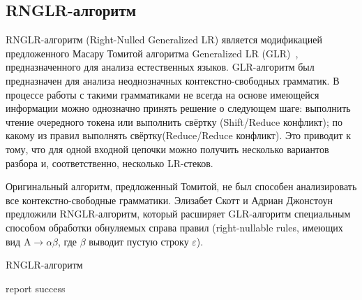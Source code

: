 \subsection{RNGLR-алгоритм}
RNGLR-алгоритм (Right-Nulled Generalized LR) является модификацией предложенного Масару Томитой алгоритма Generalized LR (GLR)~\cite{Tomita}, предназначенного для анализа естественных языков. 
GLR-алгоритм был предназначен для анализа неоднозначных контекстно-свободных грамматик. В процессе работы с такими грамматиками не всегда на основе имеющейся информации можно однозначно принять решение 
о следующем шаге: выполнить чтение очередного токена или выполнить свёртку (Shift/Reduce конфликт); по какому из правил выполнять свёртку(Reduce/Reduce конфликт). Это приводит к тому, что для одной 
входной цепочки можно получить несколько вариантов разбора и, соответственно, несколько LR-стеков.  

Оригинальный алгоритм, предложенный Томитой, не был способен анализировать все контекстно-свободные грамматики. 
Элизабет Скотт и Адриан Джонстоун предложили RNGLR-алгоритм, который расширяет GLR-алгоритм специальным способом обработки обнуляемых справа 
правил (right-nullable rules, имеющих вид $\mathrm{A} \rightarrow \alpha \beta$, где $\beta$ выводит пустую строку $\varepsilon$).

\begin{listing}[!ht]
\begin{algorithmic}[1]
\caption{RNGLR-алгоритм}
\label{rnglr}
   
   
     {report success}
    \EndIf
  \Else
    \EndFor
    \EndIf
  \EndIf
\EndFunction
{}
    \EndFor
  \EndWhile
\EndFunction
{}
  \EndWhile
\EndFunction
\end{algorithmic}
\end{listing}

